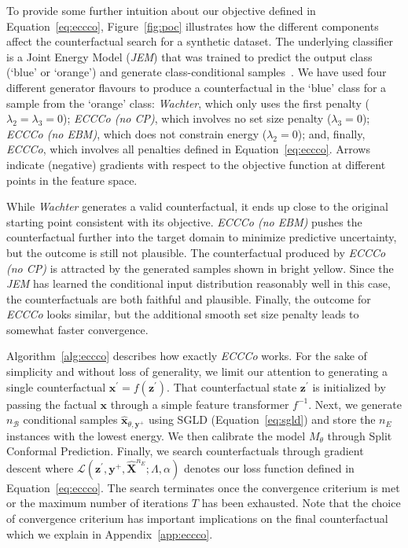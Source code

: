 \documentclass{article}
\begin{document}
To provide some further intuition about our objective defined in Equation~\ref{eq:eccco}, Figure~\ref{fig:poc} illustrates how the different components affect the counterfactual search for a synthetic dataset. The underlying classifier is a Joint Energy Model (\textit{JEM}) that was trained to predict the output class (`blue' or `orange') and generate class-conditional samples~\citep{grathwohl2020your}. We have used four different generator flavours to produce a counterfactual in the `blue' class for a sample from the `orange' class: \textit{Wachter}, which only uses the first penalty ($\lambda_2=\lambda_3=0$); \textit{ECCCo (no CP)}, which involves no set size penalty ($\lambda_3=0$); \textit{ECCCo (no EBM)}, which does not constrain energy ($\lambda_2=0$); and, finally, \textit{ECCCo}, which involves all penalties defined in Equation~\ref{eq:eccco}. Arrows indicate (negative) gradients with respect to the objective function at different points in the feature space. 

While \textit{Wachter} generates a valid counterfactual, it ends up close to the original starting point consistent with its objective. \textit{ECCCo (no EBM)} pushes the counterfactual further into the target domain to minimize predictive uncertainty, but the outcome is still not plausible. The counterfactual produced by \textit{ECCCo (no CP)} is attracted by the generated samples shown in bright yellow. Since the \textit{JEM} has learned the conditional input distribution reasonably well in this case, the counterfactuals are both faithful and plausible. Finally, the outcome for \textit{ECCCo} looks similar, but the additional smooth set size penalty leads to somewhat faster convergence. 

Algorithm~\ref{alg:eccco} describes how exactly \textit{ECCCo} works. For the sake of simplicity and without loss of generality, we limit our attention to generating a single counterfactual $\mathbf{x}^\prime=f(\mathbf{z}^\prime)$. That counterfactual state $\mathbf{z}^\prime$ is initialized by passing the factual $\mathbf{x}$ through a simple feature transformer $f^{-1}$. Next, we generate $n_{\mathcal{B}}$ conditional samples $\hat{\mathbf{x}}_{\theta,\mathbf{y}^+}$ using SGLD (Equation~\ref{eq:sgld}) and store the $n_E$ instances with the lowest energy. We then calibrate the model $M_{\theta}$ through Split Conformal Prediction. Finally, we search counterfactuals through gradient descent where $\mathcal{L}(\mathbf{z}^\prime,\mathbf{y}^+,\hat{\mathbf{X}}^{n_E}; \Lambda, \alpha)$ denotes our loss function defined in Equation~\ref{eq:eccco}. The search terminates once the convergence criterium is met or the maximum number of iterations $T$ has been exhausted. Note that the choice of convergence criterium has important implications on the final counterfactual which we explain in Appendix~\ref{app:eccco}.
\end{document}
